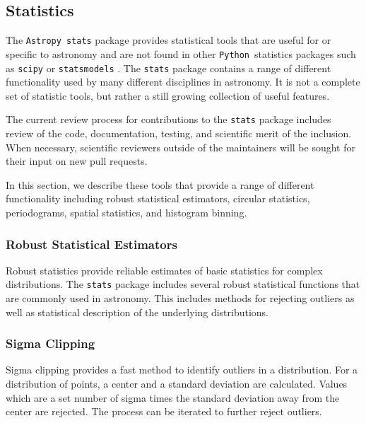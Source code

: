 \documentclass[modern]{aastex61}
\newcommand{\package}[1]{\texttt{#1}}
\newcommand{\python}{\package{Python}}
\newcommand{\astropypkg}{\package{Astropy}}
\begin{document}
\subsection{Statistics}

The \astropypkg\ \package{stats} package provides
statistical tools that are useful for or specific to
astronomy and are not found in other \python\
statistics packages such as \package{scipy}
\citep{scipy} or \package{statsmodels}
\citep{seabold2010statsmodels}.   The
\package{stats} package contains a range of
different functionality used by many different
disciplines in astronomy.   It is not a complete set
of statistic tools, but rather a still growing
collection of useful features.

The current review process for contributions to the \package{stats} package includes review of the code, documentation, testing, and scientific merit of the inclusion.  When necessary, scientific reviewers outside of the maintainers will be sought for their input on new pull requests.

In this section, we describe these tools that provide a range of different functionality including robust statistical estimators, circular statistics, periodograms, spatial statistics, and histogram binning.




\subsubsection{Robust Statistical Estimators}

Robust statistics provide reliable estimates of basic statistics for complex distributions. The \package{stats} package includes several robust statistical functions that are commonly used in astronomy. This includes methods for rejecting outliers as well as statistical description of the underlying distributions.

\subsubsection{Sigma Clipping}

Sigma clipping provides a fast method to identify outliers in a distribution. For a distribution of points, a center and a standard deviation are calculated. Values which are a set number of sigma times the standard deviation away from the center are rejected. The process can be iterated to further reject outliers.
\end{document}
